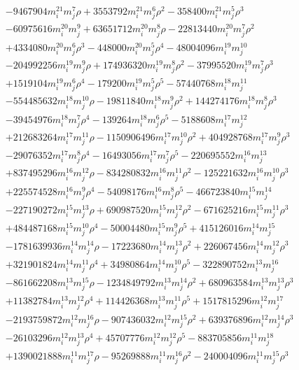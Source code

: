 {\begin{align*}
&-9467904m_i^{21}m_j^{7}\rho+3553792m_i^{21}m_j^{6}\rho^{2}-358400m_i^{21}m_j^{5}\rho^{3}\\
&-60975616m_i^{20}m_j^{9}+63651712m_i^{20}m_j^{8}\rho-22813440m_i^{20}m_j^{7}\rho^{2}\\
&+4334080m_i^{20}m_j^{6}\rho^{3}-448000m_i^{20}m_j^{5}\rho^{4}-48004096m_i^{19}m_j^{10}\\
&-204992256m_i^{19}m_j^{9}\rho+174936320m_i^{19}m_j^{8}\rho^{2}-37995520m_i^{19}m_j^{7}\rho^{3}\\
&+1519104m_i^{19}m_j^{6}\rho^{4}-179200m_i^{19}m_j^{5}\rho^{5}-57440768m_i^{18}m_j^{11}\\
&-554485632m_i^{18}m_j^{10}\rho-19811840m_i^{18}m_j^{9}\rho^{2}+144274176m_i^{18}m_j^{8}\rho^{3}\\
&-39454976m_i^{18}m_j^{7}\rho^{4}-139264m_i^{18}m_j^{6}\rho^{5}-5188608m_i^{17}m_j^{12}\\
&+212683264m_i^{17}m_j^{11}\rho-1150906496m_i^{17}m_j^{10}\rho^{2}+404928768m_i^{17}m_j^{9}\rho^{3}\\
&-29076352m_i^{17}m_j^{8}\rho^{4}-16493056m_i^{17}m_j^{7}\rho^{5}-220695552m_i^{16}m_j^{13}\\
&+837495296m_i^{16}m_j^{12}\rho-834280832m_i^{16}m_j^{11}\rho^{2}-125221632m_i^{16}m_j^{10}\rho^{3}\\
&+225574528m_i^{16}m_j^{9}\rho^{4}-54098176m_i^{16}m_j^{8}\rho^{5}-466723840m_i^{15}m_j^{14}\\
&-227190272m_i^{15}m_j^{13}\rho+690987520m_i^{15}m_j^{12}\rho^{2}-671625216m_i^{15}m_j^{11}\rho^{3}\\
&+484487168m_i^{15}m_j^{10}\rho^{4}-50004480m_i^{15}m_j^{9}\rho^{5}+415126016m_i^{14}m_j^{15}\\
&-1781639936m_i^{14}m_j^{14}\rho-17223680m_i^{14}m_j^{13}\rho^{2}+226067456m_i^{14}m_j^{12}\rho^{3}\\
&+321901824m_i^{14}m_j^{11}\rho^{4}+34980864m_i^{14}m_j^{10}\rho^{5}-322890752m_i^{13}m_j^{16}\\
&-861662208m_i^{13}m_j^{15}\rho-1234849792m_i^{13}m_j^{14}\rho^{2}+680963584m_i^{13}m_j^{13}\rho^{3}\\
&+11382784m_i^{13}m_j^{12}\rho^{4}+114426368m_i^{13}m_j^{11}\rho^{5}+1517815296m_i^{12}m_j^{17}\\
&-2193759872m_i^{12}m_j^{16}\rho-907436032m_i^{12}m_j^{15}\rho^{2}+639376896m_i^{12}m_j^{14}\rho^{3}\\
&-26103296m_i^{12}m_j^{13}\rho^{4}+45707776m_i^{12}m_j^{12}\rho^{5}-883705856m_i^{11}m_j^{18}\\
&+1390021888m_i^{11}m_j^{17}\rho-95269888m_i^{11}m_j^{16}\rho^{2}-240004096m_i^{11}m_j^{15}\rho^{3}\\

\end{align*}}
